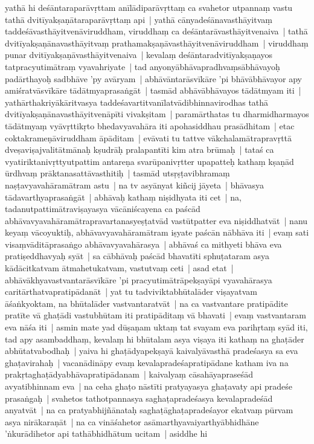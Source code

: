 \documentclass[article,12pt,a4paper]{memoir}%
\newcommand{\name}[1]{#1}
\begin{document}
	  
	  

	  
	  \pstart \leavevmode%
	\label{thakur75-122.6}yathā hi deśāntaraparāvṛttam anīlādiparāvṛttaṃ ca svahetor utpannaṃ vastu tathā dvitīyakṣaṇātaraparāvṛttaṃ api | yathā cānyadeśānavasthāyitvaṃ taddeśāvasthāyitvenāviruddham, viruddhaṃ ca deśāntarāvasthāyitvenaiva | tathā dvitīyakṣaṇānavasthāyitvaṃ prathamakṣaṇāvasthāyitvenāviruddham | viruddhaṃ punar dvitīyakṣaṇāvasthāyitvenaiva | kevalaṃ deśāntaradvitīyakṣaṇayos tatpracyutimātraṃ vyavahriyate | tad anyonyābhāvapradhvaṃsābhāvayoḥ padārthayoḥ sadbhāve 'py avāryam | abhāvāntarāsvīkāre 'pi bhāvābhāvayor apy amiśratvāsvīkāre tādātmyaprasaṅgāt | tasmād abhāvābhāvayos tādātmyam iti | \label{thakur75-122.16} yathārthakriyākāritvasya taddeśavartitvanīlatvādibhinnavirodhas tathā dvitīyakṣaṇānavasthāyitvenāpīti vivakṣitam | paramārthatas tu dharmidharmayos tādātmyaṃ vyāvṛttikṛto bhedavyavahāra iti \name{apohasiddhau} prasādhitam | etac coktakrameṇāviruddham āpāditam | evāvati tu tattve vākchalamātrapravṛttā dveṣaviṣajvalitātmānaḥ kṣudrāḥ pralapantīti kim atra brūmaḥ | \label{thakur75-122.21} tataś ca vyatiriktanivṛttyutpattim antareṇa svarūpanivṛtter upapatteḥ kathaṃ kṣaṇād ūrdhvaṃ prāktanasattāvasthitiḥ | tasmād utsṛṣṭavibhramaṃ naṣṭavyavahāramātram astu | na tv asyānyat kiñcij jāyeta | \label{thakur75-122.23} bhāvasya tādavarthyaprasaṅgāt | abhāvaḥ kathaṃ niṣidhyata iti cet | \label{thakur75-122.24} na, tadanutpattimātraviṣayasya vācāniścayena ca paścād abhāvavyavahāramātrapravartanasyeṣṭatvād vastūtpatter eva niṣiddhatvāt | \label{thakur75-122.26} nanu keyaṃ vācoyuktiḥ, abhāvavyavahāramātram iṣyate paścān nābhāva iti | evaṃ sati visaṃvāditāprasaṅgo abhāvavyavahārasya | abhāvaś ca mithyeti bhāva eva pratiṣeddhavyaḥ syāt | sa cābhāvaḥ paścād bhavatīti sphuṭataram asya kādācitkatvam ātmahetukatvam, vastutvaṃ ceti | \label{thakur75-122.29} asad etat | abhāvākhyavastvantarāsvīkāre 'pi pracyutimātrāpekṣayāpi vyavahārasya caritārthatvapratipādanāt | yat tu tadviviktabhūtalāder viṣayatvam āśaṅkyoktam, na bhūtalāder vastvantaratvāt | na ca vastvantare pratipādite pratīte vā ghaṭādi vastubhūtam iti pratipāditaṃ vā bhavati | \label{thakur75-123.1} evaṃ vastvantaram eva nāśa iti | asmin mate yad dūṣaṇam uktaṃ tat svayam eva parihṛtaṃ syād iti, tad apy asambaddhaṃ, kevalaṃ hi bhūtalam asya viṣaya iti kathaṃ na ghaṭāder abhūtatvabodhaḥ | yaiva hi ghaṭādyapekṣayā kaivalyāvasthā pradeśasya sa eva ghaṭavirahaḥ | vacanādināpy evaṃ kevalapradeśapratipādane katham iva na prakṛtaghaṭādyabhāvapratipādanam | kaivalyaṃ cāsahāyapraseśād avyatibhinnam eva | \label{thakur75-123.6} na ceha ghaṭo nāstīti pratyayasya ghaṭavaty api pradeśe prasaṅgaḥ | svahetos tathotpannasya saghaṭapradeśasya kevalapradeśād anyatvāt | \label{thakur75-123.7} na ca pratyabhijñānataḥ saghaṭāghaṭapradeśayor ekatvaṃ pūrvam asya nirākaraṇāt | \label{thakur75-123.8} na ca vināśahetor asāmarthyavaiyarthyābhidhāne 'ṅkurādihetor api tathābhidhātum ucitam | asiddhe hi 
\end{document}
